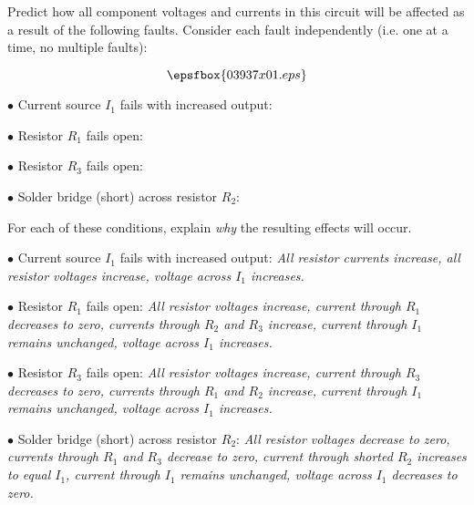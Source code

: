 

Predict how all component voltages and currents in this circuit will be affected as a result of the following faults.  Consider each fault independently (i.e. one at a time, no multiple faults):

$$\epsfbox{03937x01.eps}$$

\medskip
\item{$\bullet$} Current source $I_1$ fails with increased output:
\vskip 5pt
\item{$\bullet$} Resistor $R_1$ fails open: 
\vskip 5pt
\item{$\bullet$} Resistor $R_3$ fails open: 
\vskip 5pt
\item{$\bullet$} Solder bridge (short) across resistor $R_2$: 
\medskip

For each of these conditions, explain {\it why} the resulting effects will occur.







\medskip
\item{$\bullet$} Current source $I_1$ fails with increased output: {\it All resistor currents increase, all resistor voltages increase, voltage across $I_1$ increases.}
\vskip 5pt
\item{$\bullet$} Resistor $R_1$ fails open: {\it All resistor voltages increase, current through $R_1$ decreases to zero, currents through $R_2$ and $R_3$ increase, current through $I_1$ remains unchanged, voltage across $I_1$ increases.}
\vskip 5pt
\item{$\bullet$} Resistor $R_3$ fails open: {\it All resistor voltages increase, current through $R_3$ decreases to zero, currents through $R_1$ and $R_2$ increase, current through $I_1$ remains unchanged, voltage across $I_1$ increases.}
\vskip 5pt
\item{$\bullet$} Solder bridge (short) across resistor $R_2$: {\it All resistor voltages decrease to zero, currents through $R_1$ and $R_3$ decrease to zero, current through shorted $R_2$ increases to equal $I_1$, current through $I_1$ remains unchanged, voltage across $I_1$ decreases to zero.}
\medskip






